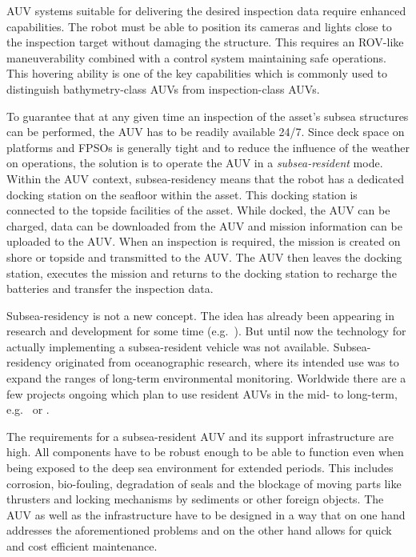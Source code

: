 \documentclass[conference]{IEEEtran}
\begin{document}
AUV systems suitable for delivering the desired inspection data require enhanced capabilities.
The robot must be able to position its cameras and lights close to the inspection target
without damaging the structure. This requires an ROV-like maneuverability combined with a
control system maintaining safe operations. This hovering ability is one of the key
capabilities which is commonly used to distinguish bathymetry-class AUVs from 
inspection-class AUVs.

To guarantee that at any given time an inspection of the asset's subsea structures can be
performed, the AUV has to be readily available 24/7. Since deck space on platforms and FPSOs is
generally tight and to reduce the influence of the weather on operations, the solution is
to operate the AUV in a \textit{subsea-resident} mode. Within the AUV context, subsea-residency means that the robot has a dedicated docking station on the seafloor within the asset.
This docking station is connected to the topside facilities of the asset. While docked, the AUV can be charged, data can be downloaded from the AUV and mission
information can be uploaded to the AUV. When an inspection is required, the mission is
created on shore or topside and transmitted to the AUV. The AUV then leaves the docking
station, executes the mission and returns to the docking station to recharge the batteries
and transfer the inspection data.

Subsea-residency is not a new concept. The idea has already been appearing in research and
development for some time (e.g.~\cite{mcleod2011}). But until now the technology
for actually implementing a subsea-resident vehicle was not available. Subsea-residency originated 
from oceanographic research, where its intended use was to
expand the ranges of long-term environmental monitoring. Worldwide there are a few
projects ongoing which plan to use resident AUVs in the mid- to long-term, e.g.~\cite{german2012} or \cite{soltwedel2013}.

The requirements for a subsea-resident AUV and its support infrastructure are high.
All components have to be robust enough to be able to function even when being exposed 
to
the deep sea environment for extended periods. This includes corrosion,
bio-fouling, degradation of seals and the blockage of moving parts like thrusters and
locking mechanisms by sediments or other foreign objects. The AUV as well as the infrastructure have to be
designed in a way that on one hand addresses the aforementioned problems and on the other
hand allows for quick and cost efficient maintenance.
\end{document}
